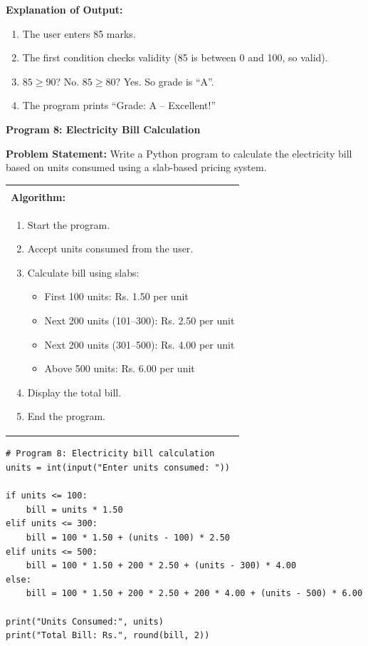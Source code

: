 \documentclass[12pt,a4paper]{article}
\makeatletter
\newenvironment{algobox}{%
  \par\vspace{4pt}%
  \noindent\begin{tabular}{@{}p{\linewidth}@{}}%
  \hline\\[-8pt]%
  \textbf{\color{blue!60!black}\small Algorithm:}\\[2pt]%
}{%
  \\[-4pt]\hline%
  \end{tabular}\par\vspace{4pt}%
}
\makeatother
\begin{document}
\textbf{Explanation of Output:}
\begin{enumerate}
  \item The user enters 85 marks.
  \item The first condition checks validity (85 is between 0 and 100, so valid).
  \item $85 \geq 90$? No. $85 \geq 80$? Yes. So grade is ``A''.
  \item The program prints ``Grade: A -- Excellent!''
\end{enumerate}

\vspace{0.5cm}

\textbf{Program 8: Electricity Bill Calculation}

\textbf{Problem Statement:}
Write a Python program to calculate the electricity bill based on units consumed using a slab-based pricing system.

\begin{algobox}
\begin{enumerate}[label=Step \arabic*:]
  \item Start the program.
  \item Accept units consumed from the user.
  \item Calculate bill using slabs:
    \begin{itemize}
      \item First 100 units: Rs. 1.50 per unit
      \item Next 200 units (101--300): Rs. 2.50 per unit
      \item Next 200 units (301--500): Rs. 4.00 per unit
      \item Above 500 units: Rs. 6.00 per unit
    \end{itemize}
  \item Display the total bill.
  \item End the program.
\end{enumerate}
\end{algobox}

\begin{lstlisting}
# Program 8: Electricity bill calculation
units = int(input("Enter units consumed: "))

if units <= 100:
    bill = units * 1.50
elif units <= 300:
    bill = 100 * 1.50 + (units - 100) * 2.50
elif units <= 500:
    bill = 100 * 1.50 + 200 * 2.50 + (units - 300) * 4.00
else:
    bill = 100 * 1.50 + 200 * 2.50 + 200 * 4.00 + (units - 500) * 6.00

print("Units Consumed:", units)
print("Total Bill: Rs.", round(bill, 2))
\end{lstlisting}
\end{document}
